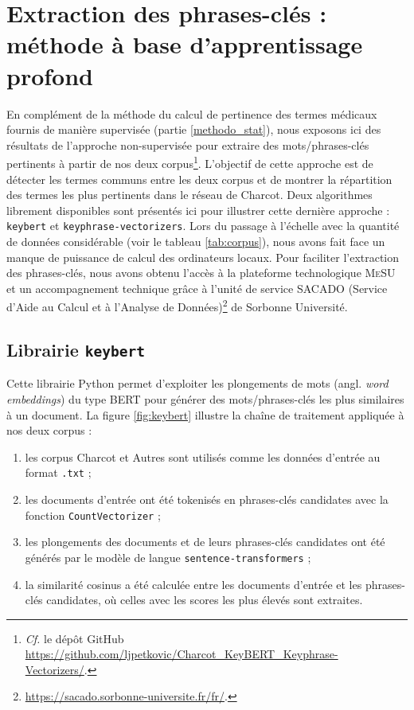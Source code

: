 \section{Extraction des phrases-clés : méthode à base d'apprentissage profond}
\label{sect:deep_learning}
En complément de la méthode du calcul de pertinence des termes médicaux fournis de manière supervisée (partie \ref{methodo_stat}), nous exposons ici des résultats de l'approche non-supervisée pour extraire des mots/phrases-clés  pertinents à partir de nos deux corpus\footnote{\textit{Cf.} le dépôt GitHub \url{https://github.com/ljpetkovic/Charcot\_KeyBERT\_Keyphrase-Vectorizers/}.}. L'objectif de cette approche est de détecter les termes communs entre les deux corpus et de montrer la répartition des termes les plus pertinents dans le réseau de Charcot. Deux algorithmes librement disponibles sont présentés ici pour illustrer cette dernière approche : \texttt{keybert} et \texttt{keyphrase-vectorizers}. Lors du passage à l'échelle avec la quantité de données considérable (voir le tableau \ref{tab:corpus}), nous avons fait face un manque de puissance de calcul des ordinateurs locaux. Pour faciliter l'extraction des phrases-clés, nous avons obtenu l'accès à la plateforme technologique \textsc{MeSU} et un accompagnement technique grâce à l'unité de service \textsc{SACADO} (Service d'Aide au Calcul et à l'Analyse de Données)\footnote{\url{https://sacado.sorbonne-universite.fr/fr/}.} de Sorbonne Université.

\subsection{Librairie \texttt{keybert}}

Cette librairie Python permet d'exploiter les plongements de mots (angl. \textit{word embeddings}) du type \textsc{BERT} pour générer des mots/phrases-clés les plus similaires à un document.
La figure \ref{fig:keybert} illustre la chaîne de traitement appliquée à nos deux corpus : 
\begin{enumerate}
\item les corpus \og Charcot \fg{} et \og Autres \fg{} sont utilisés comme les données d'entrée au format \texttt{.txt} ;
\item les documents d'entrée ont été tokenisés en phrases-clés candidates avec la fonction \texttt{CountVectorizer} ; 
\item les plongements des documents et de leurs phrases-clés candidates ont été générés par le modèle de langue \texttt{sentence-transformers} ;
\item la similarité cosinus a été calculée entre les documents d'entrée et les phrases-clés candidates, où celles avec les scores les plus élevés sont extraites.
\end{enumerate}

